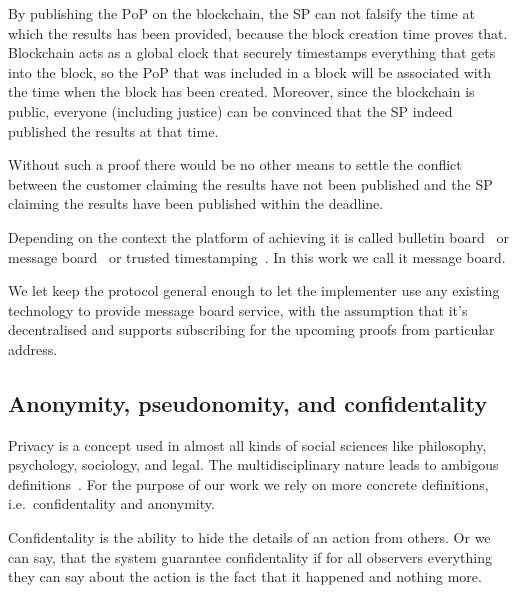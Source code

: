 \documentclass{ieeeaccess}
\begin{document}
By publishing the $\mathrm{PoP}$ on the blockchain, the SP can not falsify the time
at which the results has been provided, because the block creation time
proves that. Blockchain acts as a global clock that securely timestamps
everything that gets into the block, so the $\mathrm{PoP}$ that was included in a
block will be associated with the time when the block has been created. Moreover, since the blockchain is public, everyone (including justice) can be convinced that the SP indeed published the results at that time.

Without such a proof there would be no other means to settle the conflict between the customer claiming the results have not been published and the SP claiming the results have been published within the deadline.

Depending on the context the platform of achieving it is called bulletin board~\cite{achenbach2015improved} or message board~\cite{hinarejos2019solution} or trusted timestamping~\cite{gipp2015decentralized}. In this work we call it message board.



We let keep the protocol general enough to let the implementer use any
existing technology to provide message board service, with the
assumption that it's decentralised and supports subscribing for the
upcoming proofs from particular address.



\subsection{Anonymity, pseudonomity, and confidentality}\label{pseudo-anonymous-vs-anonymous-blockchain}

Privacy is a concept used in almost all kinds of social sciences like philosophy, psychology, sociology, and legal. The multidisciplinary nature leads to ambigous definitions~\cite{smith2011information}. For the purpose of our work we rely on more concrete definitions, i.e.~confidentality and anonymity.

Confidentality is the ability to hide the details of an action from others. Or we can say, that the system guarantee confidentality if for all observers everything they can say about the action is the fact that it happened and nothing more.
\end{document}
